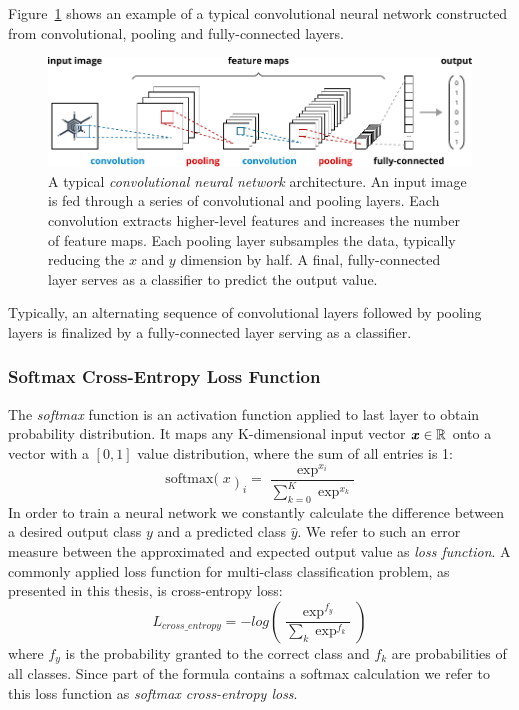 	Figure~\ref{fig:convnet} shows an example of a typical convolutional neural network constructed from convolutional, pooling and fully-connected layers.
		\begin{figure}[tp]
  		\centering
    	\includegraphics{img/convnet.pdf}
    	\caption{A typical \emph{convolutional neural network} architecture. An input image is fed through a series of convolutional and pooling layers. Each convolution extracts higher-level features and increases the number of feature maps. Each pooling layer subsamples the data, typically reducing the $x$ and $y$ dimension by half. A final, fully-connected layer serves as a classifier to predict the output value.}
    	\label{fig:convnet}
	\end{figure}
	Typically, an alternating sequence of convolutional layers followed by pooling layers is finalized by a fully-connected layer serving as a  classifier.

\subsubsection{Softmax Cross-Entropy Loss Function}
The \emph{softmax} function is an activation function applied to last layer to obtain probability distribution. It maps any K-dimensional input vector $\boldsymbol{x} \in\mathbb{R}$ onto a vector with a $[0, 1]$ value distribution, where the sum of all entries is \num{1}:
%
$$
\operatorname{softmax(}x\operatorname{)}_i= \frac{\exp^{x_i}}{\sum_{k=0}^K \exp^{x_k}}
$$
%
In order to train a neural network we constantly calculate the difference between a desired output class $y$ and a predicted class $\hat{y}$. We refer to such an error measure between the approximated and expected output value as \emph{loss function}. A commonly applied loss function for multi-class classification problem, as presented in this thesis, is cross-entropy loss:
%
$$
L_{cross\_entropy} = -log \left( \frac{\exp^{f_y}}{\sum_k \exp^{f_k}} \right)
$$
%
where $f_y$ is the probability granted to the correct class and $f_k$ are probabilities of all classes. Since part of the formula contains a softmax calculation we refer to this loss function as \emph{softmax cross-entropy loss}.

